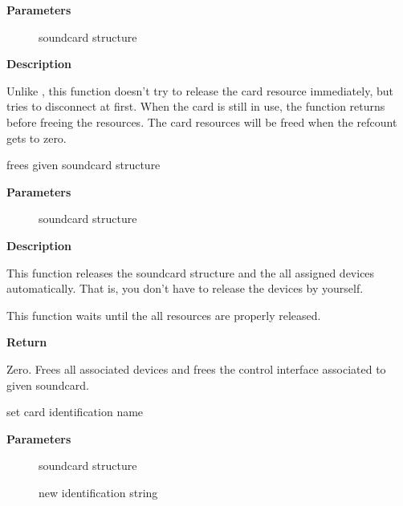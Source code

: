 \documentclass[a4paper,8pt,english]{sphinxmanual}
\begin{document}
\textbf{Parameters}
\begin{description}
\item[{}] \leavevmode
soundcard structure

\end{description}

\textbf{Description}

Unlike , this function doesn't try to release the card
resource immediately, but tries to disconnect at first.  When the card
is still in use, the function returns before freeing the resources.
The card resources will be freed when the refcount gets to zero.

\begin{fulllineitems}
\label{sound/kernel-api/alsa-driver-api:c.snd_card_free}
frees given soundcard structure

\end{fulllineitems}


\textbf{Parameters}
\begin{description}
\item[{}] \leavevmode
soundcard structure

\end{description}

\textbf{Description}

This function releases the soundcard structure and the all assigned
devices automatically.  That is, you don't have to release the devices
by yourself.

This function waits until the all resources are properly released.

\textbf{Return}

Zero. Frees all associated devices and frees the control
interface associated to given soundcard.

\begin{fulllineitems}
\label{sound/kernel-api/alsa-driver-api:c.snd_card_set_id}
set card identification name

\end{fulllineitems}


\textbf{Parameters}
\begin{description}
\item[{}] \leavevmode
soundcard structure

\item[{}] \leavevmode
new identification string

\end{description}
\end{document}
